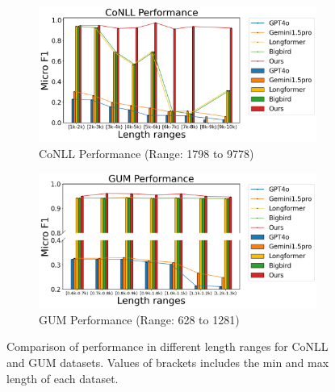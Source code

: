 \documentclass[11pt]{article}
\begin{document}
\begin{figure}[!htp]
    \begin{subfigure}[b]{0.47\linewidth}   
        \includegraphics[width=\textwidth]{images/output_conll.png} 
        \caption{CoNLL Performance (Range: 1798 to 9778)}
        \label{fig:conll_results}
    \end{subfigure}
    \hfill
    \begin{subfigure}[b]{0.47\linewidth}  
        \includegraphics[width=\textwidth]{images/output_gum.png} 
        \caption{GUM Performance (Range: 628 to 1281)}
        \label{fig:gum_results}
    \end{subfigure}
    \caption{Comparison of performance in different length ranges for CoNLL and GUM datasets. Values of brackets includes the min and max length of each dataset.}
    \label{fig:combined_results}
    \vspace{-10pt}
\end{figure}
\end{document}

